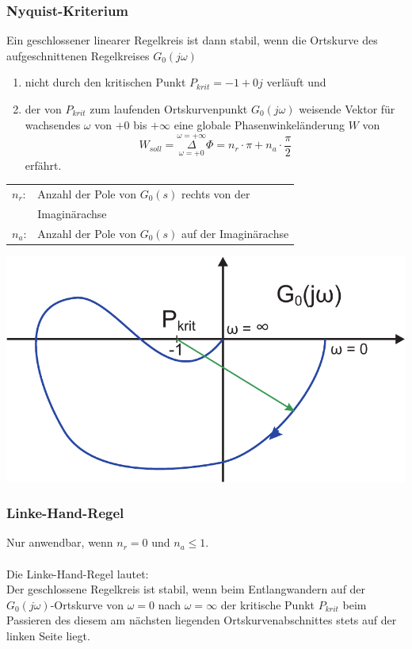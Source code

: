 \documentclass[a4paper,twocolumn,10pt]{article}
\begin{document}
\subsubsection{Nyquist-Kriterium}
Ein geschlossener linearer Regelkreis ist dann stabil, wenn die Ortskurve des aufgeschnittenen Regelkreises $G_0(j\omega)$
\begin{enumerate}
\item nicht durch den kritischen Punkt $P_{krit}=-1+0j$ verläuft und
\item der von $P_{krit}$ zum laufenden Ortskurvenpunkt $G_0(j\omega)$ weisende Vektor für wachsendes $\omega$ von $+0$ bis $+\infty$ eine globale Phasenwinkeländerung $W$ von
\begin{equation*}
W_{soll}=\overset{\omega=+\infty}{\underset{\omega=+0}{\Delta}}\Phi=n_r\cdot\pi+n_a\cdot\frac{\pi}{2}
\end{equation*}
erfährt.
\end{enumerate}
\begin{tabular}{ll}
$n_r$: & Anzahl der Pole von $G_0(s)$ rechts von der\\
& Imaginärachse\\
$n_a$: & Anzahl der Pole von $G_0(s)$ auf der Imaginärachse
\end{tabular}
\begin{center}
\includegraphics[width=0.8\columnwidth]{Grafiken/Nyquist_Kriterium}
\end{center}

\subsubsection{Linke-Hand-Regel}
Nur anwendbar, wenn $n_r=0$ und $n_a\leq 1$.\\\\
Die Linke-Hand-Regel lautet:\\
Der geschlossene Regelkreis ist stabil, wenn beim Entlangwandern auf der $G_0(j\omega)$-Ortskurve von $\omega=0$ nach $\omega=\infty$ der kritische Punkt $P_{krit}$ beim Passieren des diesem am nächsten liegenden Ortskurvenabschnittes stets auf der linken Seite liegt.
\end{document}
